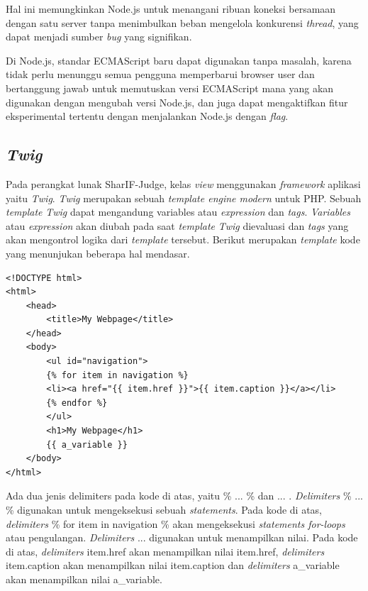 Hal ini memungkinkan Node.js untuk menangani ribuan koneksi bersamaan dengan satu server tanpa menimbulkan beban mengelola konkurensi \textit{thread}, yang dapat menjadi sumber \textit{bug} yang signifikan.

Di Node.js, standar ECMAScript baru dapat digunakan tanpa masalah, karena tidak perlu menunggu semua pengguna memperbarui browser user dan bertanggung jawab untuk memutuskan versi ECMAScript mana yang akan digunakan dengan mengubah versi Node.js, dan juga dapat mengaktifkan fitur eksperimental tertentu dengan menjalankan Node.js dengan \textit{flag}.

\subsection{\textit{Twig}}
Pada perangkat lunak SharIF-Judge, kelas \textit{view} menggunakan \textit{framework} aplikasi yaitu \textit{Twig}. \textit{Twig} merupakan sebuah \textit{template engine modern} untuk PHP\cite{twig}. Sebuah \textit{template} \textit{Twig} dapat mengandung variables atau \textit{expression} dan \textit{tags}. \textit{Variables} atau \textit{expression} akan diubah pada saat \textit{template} \textit{Twig} dievaluasi dan \textit{tags} yang akan mengontrol logika dari \textit{template} tersebut. Berikut merupakan \textit{template} kode yang menunjukan beberapa hal mendasar.

 \begin{lstlisting}[basicstyle=\ttfamily, frame=single,
    columns=fullflexible, breaklines=true, numbers=none]
<!DOCTYPE html>
<html>
    <head>
        <title>My Webpage</title>
    </head>
    <body>
        <ul id="navigation">
        {% for item in navigation %}
        <li><a href="{{ item.href }}">{{ item.caption }}</a></li>
        {% endfor %}
        </ul>
        <h1>My Webpage</h1>
        {{ a_variable }}
    </body>
</html>
    \end{lstlisting}

Ada dua jenis delimiters pada kode di atas, yaitu {\% ... \%} dan {{ ... }}. \textit{Delimiters} {\% ... \%} digunakan untuk mengeksekusi sebuah \textit{statements}. Pada kode di atas, \textit{delimiters} {\% for item in navigation \%} akan mengeksekusi \textit{statements for-loops} atau pengulangan. \textit{Delimiters} {{ ... }} digunakan untuk menampilkan nilai. Pada kode di atas, \textit{delimiters} {{ item.href }} akan menampilkan nilai item.href, \textit{delimiters} {{ item.caption }} akan menampilkan nilai item.caption dan \textit{delimiters} {{ a\_variable }} akan menampilkan nilai a\_variable.




